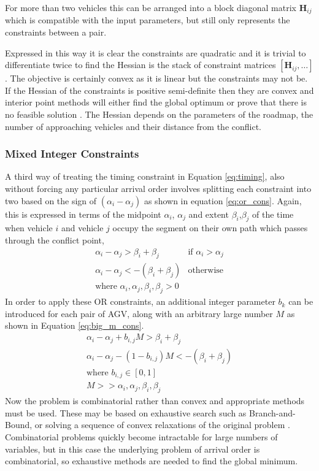 \documentclass[]{article}
\begin{document}
For more than two vehicles this can be arranged into a block diagonal matrix $\bm{H}_{ij}$ which is compatible with the input parameters, but still only represents the constraints between a pair. 

Expressed in this way it is clear the constraints are quadratic and it is trivial to differentiate twice to find the Hessian is the stack of constraint matrices $[\bm{H}_{ij}, \hdots]$. The objective is certainly convex as it is linear but the constraints may not be. If the Hessian of the constraints is positive semi-definite then they are convex and interior point methods will either find the global optimum or prove that there is no feasible solution \cite{Boyd2004}. The Hessian depends on the parameters of the roadmap, the number of approaching vehicles and their distance from the conflict. 

\subsubsection{Mixed Integer Constraints}
\label{sec:milp_constraints}
A third way of treating the timing constraint in Equation \ref{eq:timing}, also without forcing any particular arrival order involves splitting each constraint into two based on the sign of $(\alpha_i-\alpha_j)$ as shown in equation \ref{eq:or_cons}. Again, this is expressed in terms of the midpoint $\alpha_i$, $\alpha_j$ and extent $\beta_i$,$\beta_j$ of the time when vehicle $i$ and vehicle $j$ occupy the segment on their own path which passes through the conflict point,
\begin{equation}
	\begin{array}{cc}
		\alpha_i - \alpha_j > \beta_i + \beta_j &\textrm{if  }\alpha_i >\alpha_j  \\
		\alpha_i - \alpha_j < -(\beta_i + \beta_j) & \textrm{otherwise}\\
		\textrm{where } \alpha_i, \alpha_j, \beta_i, \beta_j >0
	\end{array}
	\label{eq:or_cons}
\end{equation}
In order to apply these OR constraints, an additional integer parameter $b_k$ can be introduced for each pair of AGV, along with an arbitrary large number $M$ as shown in Equation \ref{eq:big_m_cons}. 
\begin{equation}
	\begin{array}{cc}
		\alpha_i - \alpha_j + b_{i,j}M > \beta_i + \beta_j \\
		\alpha_i - \alpha_j - (1-b_{i,j})M < -(\beta_i + \beta_j) \\
		\textrm{where } b_{i,j}\in[0,1] \\
		M>>\alpha_i, \alpha_j, \beta_i, \beta_j
	\end{array}
	\label{eq:big_m_cons}
\end{equation}
Now the problem is combinatorial rather than convex and appropriate methods must be used. These may be based on exhaustive search such as Branch-and-Bound, or solving a sequence of convex relaxations of the original problem \cite{Murray2010}. Combinatorial problems quickly become intractable for large numbers of variables, but in this case the underlying problem of arrival order is combinatorial, so exhaustive methods are needed to find the global minimum. 
\end{document}
